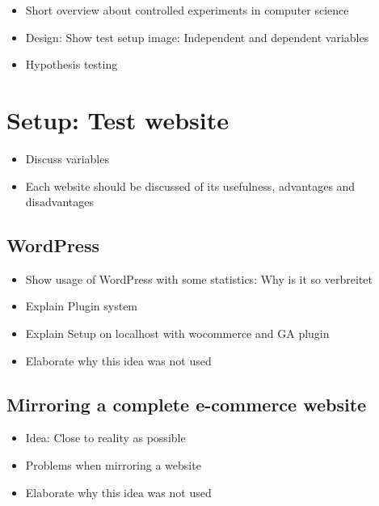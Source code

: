 \begin{itemize}
\item Short overview about controlled experiments in computer science
\item Design: Show test setup image: Independent and dependent variables
\item Hypothesis testing
\end{itemize}










\section{Setup: Test website}


\begin{itemize}
\item Discuss variables
\item Each website should be discussed of its usefulness, advantages and disadvantages
\end{itemize}


\subsection{WordPress}

\begin{itemize}
    \item Show usage of WordPress with some statistics: Why is it so verbreitet
    \item Explain Plugin system
    \item Explain Setup on localhost with wocommerce and GA plugin
    \item Elaborate why this idea was not used
\end{itemize}

\subsection{Mirroring a complete e-commerce website}

\begin{itemize}
    \item Idea: Close to reality as possible
    \item Problems when mirroring a website
    \item Elaborate why this idea was not used
\end{itemize}

